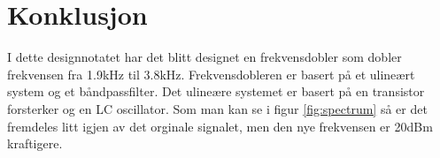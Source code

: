 
\section{Konklusjon}
\label{konklusjon}

I dette designnotatet har det blitt designet en frekvensdobler som dobler frekvensen fra 1.9kHz til 3.8kHz. Frekvensdobleren er basert på et ulineært system og et båndpassfilter. Det ulineære systemet er basert på en transistor forsterker og en LC oscillator. Som man kan se i figur \ref{fig:spectrum} så er det fremdeles litt igjen av det orginale signalet, men den nye frekvensen er 20dBm kraftigere. 